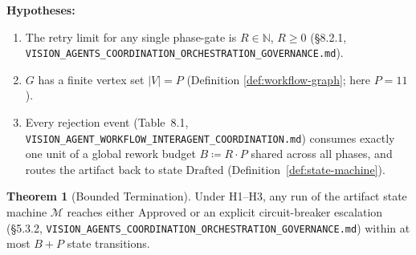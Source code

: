 \documentclass[12pt]{article}
\theoremstyle{definition}
\newtheorem{theorem}{Theorem}
\newcommand{\code}[1]{\texttt{#1}}
\newcommand{\VisionGov}{\code{VISION\_AGENTS\_\allowbreak COORDINATION\_\allowbreak ORCHESTRATION\_\allowbreak GOVERNANCE.md}}
\newcommand{\VisionFlow}{\code{VISION\_AGENT\_\allowbreak WORKFLOW\_\allowbreak INTERAGENT\_\allowbreak COORDINATION.md}}
\begin{document}
\textbf{Hypotheses:}
\begin{sloppypar}
\begin{enumerate}
    \item[H1] The retry limit for any single phase-gate is $R \in
              \mathbb{N}$, $R \geq 0$ (\S8.2.1,
              \VisionGov{}).
    \item[H2] $G$ has a finite vertex set $|V| = P$ (Definition
              \ref{def:workflow-graph}; here $P = 11$).
    \item[H3] Every rejection event (Table~8.1,
              \VisionFlow{})
              consumes exactly one unit of a global rework budget
              $B \coloneqq R \cdot P$ shared across all phases, and routes
              the artifact back to state $\mathrm{Drafted}$
              (Definition~\ref{def:state-machine}).
\end{enumerate}
\end{sloppypar}

\begin{theorem}[Bounded Termination]
\label{thm:rework}
Under H1--H3, any run of the artifact state machine $\mathcal{M}$ reaches
either $\mathrm{Approved}$ or an explicit circuit-breaker escalation
(\S5.3.2, \VisionGov{})
within at most $B + P$ state transitions.
\end{theorem}
\end{document}
